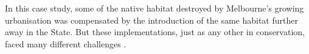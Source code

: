 \documentclass[12pt,a4paper]{article}
\begin{document}
In this case study, some of the native habitat destroyed by Melbourne's growing urbanisation was compensated by the introduction of the same habitat further away in the State.
But these implementations, just as any other in conservation, faced many different challenges \citep{keith2011uncertainty, vanwilgen2011critical}.\\
%
\end{document}
